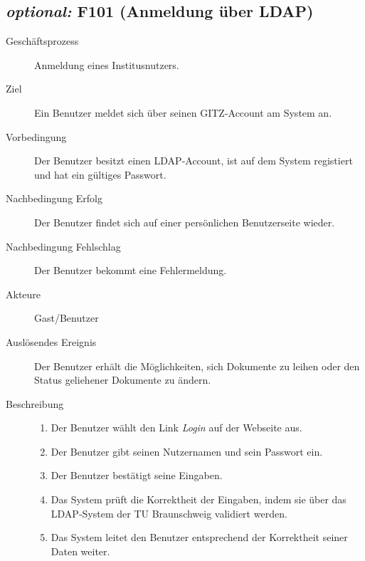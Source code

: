 \subsection{\emph{optional:} F101 (Anmeldung über LDAP)}
\label{F:AnmeldungAFS}
\begin{description}
  \item[Geschäftsprozess]Anmeldung eines Institusnutzers.
  \item[Ziel]Ein Benutzer meldet sich über seinen \gls{GITZ}-Account am System an.
  \item[Vorbedingung]Der Benutzer besitzt einen \gls{LDAP}-Account, ist auf dem System registiert und hat ein gültiges Passwort.
  \item[Nachbedingung Erfolg]Der Benutzer findet sich auf einer persönlichen Benutzerseite wieder.
  \item[Nachbedingung Fehlschlag]Der Benutzer bekommt eine Fehlermeldung.
  \item[Akteure]Gast/Benutzer
  \item[Auslösendes Ereignis]Der Benutzer erhält die Möglichkeiten, sich Dokumente zu leihen oder den Status geliehener Dokumente zu ändern.
  \item[Beschreibung]\hfill
    \begin{enumerate}
      \item Der Benutzer wählt den Link \emph{Login} auf der Webseite aus.
      \item Der Benutzer gibt seinen Nutzernamen und sein Passwort ein.
      \item Der Benutzer bestätigt seine Eingaben.
      \item Das System prüft die Korrektheit der Eingaben, indem sie über das \gls{LDAP}-System der TU Braunschweig validiert werden.
      \item Das System leitet den Benutzer entsprechend der Korrektheit seiner Daten weiter.
    \end{enumerate}
\end{description}

